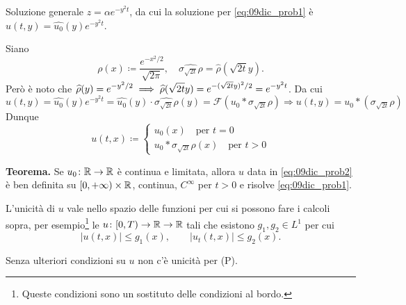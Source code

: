 Soluzione generale $z = \alpha e^{-y^2 t}$, da cui la soluzione per \eqref{eq:09dic_prob1} è $\hat{u}(t,y) = \hat{u_0}(y) e^{-y^2 t}$.

Siano 
%
$$
	\rho(x) \coloneqq \frac{e^{-x^2 / 2}}{\sqrt{2\pi}}, \quad  \hat{\sigma_{\sqrt{2t}}\rho} = \hat{\rho}(\sqrt{2t}y).
$$
%
Però è noto che $\displaystyle \widehat{\rho}(y) = e^{-y^2/2} \implies \widehat{\rho}(\sqrt{2t}y) = e^{-(\sqrt{2t}y)^2 / 2} = e^{-y^2 t}$. Da cui
%
$$
	\hat{u}(t,y) = \hat{u_0} (y) e^{-y^2t} = \hat{u_0}(y) \cdot \hat{\sigma_{\sqrt{2t}} \rho}(y)
	= \mathcal{F}(u_0 \ast \sigma_{\sqrt{2t}} \rho)
	\Longrightarrow u(t,y) = u_0 \ast \left( \sigma_{\sqrt{2t}} \rho \right)
$$
%
Dunque
%
\begin{equation}
\label{eq:09dic_prob2} \tag{$\ast$}
	u(t,x) \coloneqq 
	\begin{cases}
		u_0(x) \quad \text{per } t=0 \\
		u_0 \ast \sigma_{\sqrt{2t}} \rho(x) \quad \text{per } t > 0
	\end{cases} 
\end{equation}

\textbf{Teorema.} Se $u_0 \colon \mathbb R \to \mathbb R$ è continua e limitata, allora $u$ data in \eqref{eq:09dic_prob2} è ben definita su $[0,+\infty) \times \mathbb R$, continua, $C^\infty$ per $t>0$ e risolve \eqref{eq:09dic_prob1}.

L'unicità di $u$ vale nello spazio delle funzioni per cui si possono fare i calcoli sopra, per esempio\footnote{Queste condizioni sono un sostituto delle condizioni al bordo.} le $u \colon [0,T) \to \mathbb R \to \mathbb R$ tali che esistono $g_1,g_2 \in L^1$ per cui
$$
	\left| u(t,x) \right| \leq g_1(x), \qquad \left| u_t(t,x) \right| \leq g_2(x).
$$

Senza ulteriori condizioni su $u$ non c'è unicità per (P).




